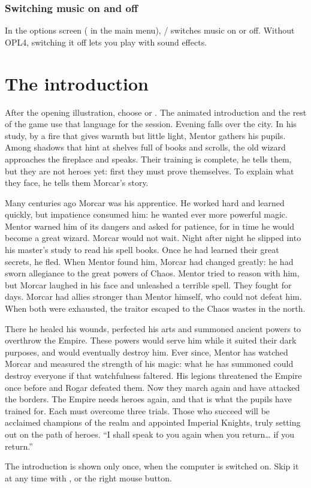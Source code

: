 \subsection{Switching music on and off}
In the options screen ( in the main menu), / switches music on or off. Without OPL4, switching it off lets you play with sound effects.

\chapter{The introduction}\label{cap:intro}
After the opening illustration, choose  or . The animated introduction and the rest of the game use that language for the session. Evening falls over the city. In his study, by a fire that gives warmth but little light, Mentor gathers his pupils. Among shadows that hint at shelves full of books and scrolls, the old wizard approaches the fireplace and speaks.
Their training is complete, he tells them, but they are not heroes yet: first they must prove themselves. To explain what they face, he tells them Morcar's story.

Many centuries ago Morcar was his apprentice. He worked hard and learned quickly, but impatience consumed him: he wanted ever more powerful magic. Mentor warned him of its dangers and asked for patience, for in time he would become a great wizard. Morcar would not wait. Night after night he slipped into his master's study to read his spell books. Once he had learned their great secrets, he fled.
When Mentor found him, Morcar had changed greatly: he had sworn allegiance to the great powers of Chaos. Mentor tried to reason with him, but Morcar laughed in his face and unleashed a terrible spell. They fought for days. Morcar had allies stronger than Mentor himself, who could not defeat him. When both were exhausted, the traitor escaped to the Chaos wastes in the north.

There he healed his wounds, perfected his arts and summoned ancient powers to overthrow the Empire. These powers would serve him while it suited their dark purposes, and would eventually destroy him. Ever since, Mentor has watched Morcar and measured the strength of his magic: what he has summoned could destroy everyone if that watchfulness faltered. His legions threatened the Empire once before and Rogar defeated them. Now they march again and have attacked the borders.
The Empire needs heroes again, and that is what the pupils have trained for. Each must overcome three trials. Those who succeed will be acclaimed champions of the realm and appointed Imperial Knights, truly setting out on the path of heroes. ``I shall speak to you again when you return\ldots{} if you return.''

The introduction is shown only once, when the computer is switched on. Skip it at any time with ,  or the right mouse button.
